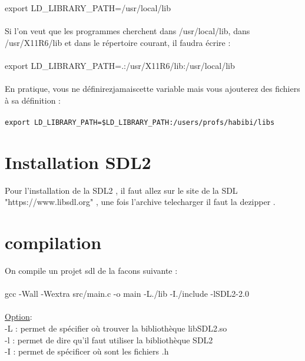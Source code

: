 \documentclass[a4paper,12pt,openany]{book}
\begin{document}
export LD_LIBRARY_PATH=/usr/local/lib\\
\\
Si l’on veut que les programmes cherchent dans /usr/local/lib, dans /usr/X11R6/lib et dans le répertoire courant, il faudra écrire :\\
\\
export LD_LIBRARY_PATH=.:/usr/X11R6/lib:/usr/local/lib\\
\\
En pratique, vous ne définirezjamaiscette variable mais vous ajouterez des fichiers à sa définition :\\
\\
\verb+export LD_LIBRARY_PATH=$LD_LIBRARY_PATH:/users/profs/habibi/libs+\\





\section{Installation SDL2}

Pour l'installation de la SDL2 , il faut allez sur le site de la SDL "https://www.libsdl.org" , une fois l'archive telecharger il faut la dezipper .\\


\section{compilation}
On compile un projet sdl de la facons suivante : \\
\\
gcc -Wall -Wextra src/main.c -o main -L./lib -I./include -lSDL2-2.0 \\
\\
\underline{Option}:\\
-L : permet de spécifier où trouver la bibliothèque libSDL2.so \\
-l : permet de dire qu’il faut utiliser la bibliothèque SDL2\\
-I : permet de spécificer où sont les fichiers .h\\
\end{document}
